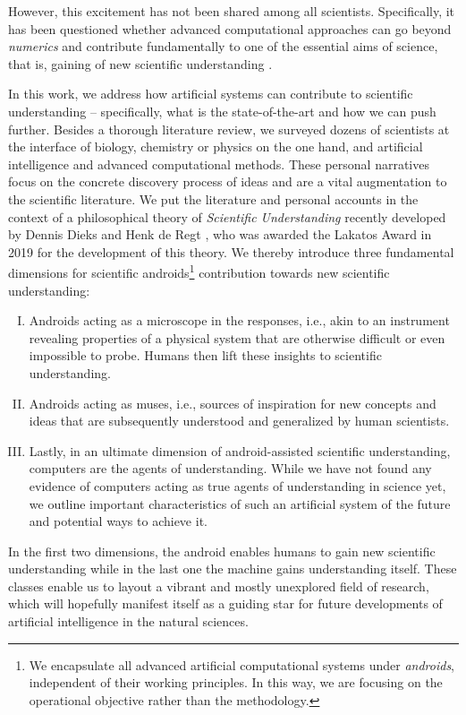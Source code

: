 However, this excitement has not been shared among all scientists. Specifically, it has been questioned whether advanced computational approaches can go beyond \textit{numerics} \cite{hoffmann2020simulationA, hoffmann2020simulationB, hoffmann2020simulationC, marcus2020next,thaler2021} and contribute fundamentally to one of the essential aims of science, that is, gaining of new scientific understanding \cite{potochnik2015diverse,potochnik2017idealization,de2017understanding}.

In this work, we address how artificial systems can contribute to scientific understanding -- specifically, what is the state-of-the-art and how we can push further. Besides a thorough literature review, we surveyed dozens of scientists at the interface of biology, chemistry or physics on the one hand, and artificial intelligence and advanced computational methods. These personal narratives focus on the concrete discovery process of ideas and are a vital augmentation to the scientific literature. We put the literature and personal accounts in the context of a philosophical theory of \textit{Scientific Understanding} recently developed by Dennis Dieks and Henk de Regt \cite{de2005contextual,de2017understanding}, who was awarded the Lakatos Award in 2019 for the development of this theory. We thereby introduce three fundamental dimensions for scientific androids\footnote{We encapsulate all advanced artificial computational systems under \textit{androids}, independent of their working principles. In this way, we are focusing on the operational objective rather than the methodology.} contribution towards new scientific understanding: 
\begin{enumerate}[I)]
\item Androids acting as a microscope in the responses, i.e., akin to an instrument revealing properties of a physical system that are otherwise difficult or even impossible to probe. Humans then lift these insights to scientific understanding.
\item Androids acting as muses, i.e., sources of inspiration for new concepts and ideas that are subsequently understood and generalized by human scientists.
\item Lastly, in an ultimate dimension of android-assisted scientific understanding, computers are the agents of understanding. While we have not found any evidence of computers acting as true agents of understanding in science yet, we outline important characteristics of such an artificial system of the future and potential ways to achieve it.
\end{enumerate}
In the first two dimensions, the android enables humans to gain new scientific understanding while in the last one the machine gains understanding itself. These classes enable us to layout a vibrant and mostly unexplored field of research, which will hopefully manifest itself as a guiding star for future developments of artificial intelligence in the natural sciences.

